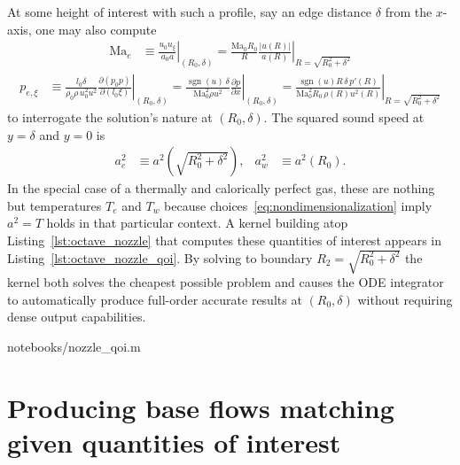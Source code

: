 \documentclass[letterpaper,11pt,nointlimits,reqno]{amsart}
\newcommand{\Mach}[1][]{\mbox{Ma}_{#1}}
\begin{document}
At some height of interest with such a profile, say an edge distance $\delta$
from the $x$-axis, one may also compute
\begin{align}
  \Mach[e]{}
  &\equiv
  \left. \frac{u_0 u_\xi}{a_0 a} \right|_{\left(R_0,\delta\right)}
  =
  \left.
    \frac{\Mach[0]{} R_0}{R}
    \frac{\left|u\!\left(R\right)\right|}
         {      a\!\left(R\right)       }
  \right|_{R = \sqrt{R_0^2 + \delta^2}}
\end{align}
\begin{align}
  p_{e,\xi}
  &\equiv
  \left.
  \frac{l_0 \delta}{\rho_0 \rho \, u_0^2 u^2}
    \frac{\partial\left(p_0 p\right)}{\partial\left(l_0 \xi\right)}
  \right|_{\left(R_0,\delta\right)}
  =
  \left.
    \frac{\operatorname{sgn}(u) \, \delta}{\Mach[0]^2 \rho u^2}
      \frac{\partial{}p}{\partial{}x}
  \right|_{\left(R_0,\delta\right)}
  =
  \left.
    \frac{\operatorname{sgn}(u) R \, \delta \, p'\!\left(R\right)}
         {\Mach[0]^2 R_0 \, \rho\!\left(R\right) u^2\!\left(R\right)}
  \right|_{R=\sqrt{R_0^2 + \delta^2}}
\end{align}
to interrogate the solution's nature at $\left(R_0, \delta\right)$.  The squared
sound speed at $y=\delta$ and $y=0$ is
\begin{align}
  a^2_e
  &\equiv
  a^2\!\left(\sqrt{R_0^2 + \delta^2}\right)
,
&
  a^2_w
  &\equiv
  a^2\!\left(R_0\right)
.
\end{align}
In the special case of a thermally and calorically perfect gas, these are
nothing but temperatures $T_e$ and $T_w$ because
choices~\eqref{eq:nondimensionalization} imply $a^2 = T$ holds in that
particular context.  A kernel building atop Listing~\ref{lst:octave_nozzle}
that computes these quantities of interest appears in
Listing~\ref{lst:octave_nozzle_qoi}.  By solving to boundary $R_2 = \sqrt{R_0^2
+ \delta^2}$ the kernel both solves the cheapest possible problem and causes
the ODE integrator to automatically produce full-order accurate results at
$\left(R_0,\delta\right)$ without requiring dense output capabilities.


                {notebooks/nozzle_qoi.m}

\pagebreak[4]{}

\section{Producing base flows matching given quantities of interest}
\end{document}
